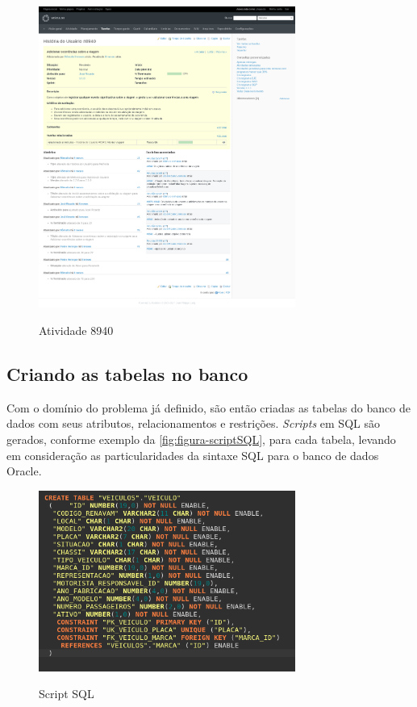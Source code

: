 \begin{figure}[!htb]
    \centering
    \caption{Atividade 8940}
    \includegraphics[width=0.75\textwidth]{dados/figuras/veiculos-atividade1.png}
    \label{fig:figura-atividade8940}
\end{figure}


\subsection{Criando as tabelas no banco}
\label{sbs:desenvolvimentoTabelas}

Com o domínio do problema já definido, são então criadas as tabelas do banco de dados com seus atributos, relacionamentos e restrições.
\textit{Scripts} em SQL são gerados, conforme exemplo da \autoref{fig:figura-scriptSQL}, para cada tabela, levando em consideração as particularidades da sintaxe SQL para o banco de dados Oracle. 

\begin{figure}[!htb]
    \centering
    \caption{Script SQL}
    \includegraphics[width=0.75\textwidth]{dados/figuras/scriptSQL.png}
    \label{fig:figura-scriptSQL}
\end{figure}

